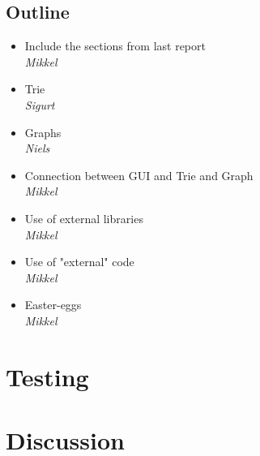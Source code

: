 \documentclass[a4paper,11pt]{article}
\begin{document}
\subsection{Outline}
\begin{itemize}
	\item Include the sections from last report \\
		\textsl{Mikkel}
	\item Trie \\
		\textsl{Sigurt}
	\item Graphs \\
		\textsl{Niels}
	\item Connection between GUI and Trie and Graph \\
		\textsl{Mikkel}
	\item Use of external libraries \\
		\textsl{Mikkel}
	\item Use of "external" code \\
		\textsl{Mikkel}
	\item Easter-eggs \\
		\textsl{Mikkel}
\end{itemize}

\pagebreak
\section{Testing}
\label{sec:Testing}


\pagebreak
\section{Discussion}
\label{sec:Discussion}
\end{document}

